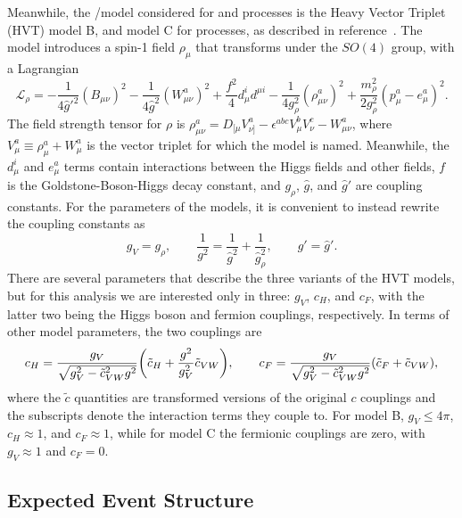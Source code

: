 Meanwhile, the \Wpr/\Zpr model considered for \ggF and \DY processes is the Heavy Vector Triplet (HVT) model B, and model C for \VBF processes, as described in reference~\cite{Pappadopulo_2014}.
The model introduces a spin-1 field $\rho_\mu$ that transforms under the $SO(4)$ group, with a Lagrangian
\begin{equation}
  \mathcal{L}_\rho=-\frac{1}{4\hat{g}'^2}(B_{\mu\nu})^2-\frac{1}{4\hat{g}^2}(W_{\mu\nu}^a)^2+\frac{f^2}{4}d_\mu^id^{\mu i}-\frac{1}{4g_\rho^2}(\rho_{\mu\nu}^a)^2+\frac{m_\rho^2}{2g_\rho^2}(p_\mu^a-e_\mu^a)^2.
\end{equation}
The field strength tensor for $\rho$ is $\rho_{\mu\nu}^a=D_{[\mu}V_{\nu]}^a-\epsilon^{abc}V_\mu^bV_\nu^c-W_{\mu\nu}^a$, where $V_\mu^a\equiv\rho_\mu^a+W_\mu^a$ is the vector triplet for which the model is named.
Meanwhile, the $d_\mu^i$ and $e_\mu^a$ terms contain interactions between the Higgs fields and other fields, $f$ is the Goldstone-Boson-Higgs decay constant, and $g_\rho$, $\hat{g}$, and $\hat{g}'$ are coupling constants.
For the parameters of the models, it is convenient to instead rewrite the coupling constants as
\begin{equation}
  g_V=g_\rho,\qquad \frac{1}{g^2}=\frac{1}{\hat{g}^2}+\frac{1}{\hat{g}_\rho^2},\qquad g'=\hat{g}'.
\end{equation}
There are several parameters that describe the three variants of the HVT models, but for this analysis we are interested only in three: $g_V$, $c_H$, and $c_F$, with the latter two being the Higgs boson and fermion couplings, respectively.
In terms of other model parameters, the two couplings are
\begin{equation}
  c_H=\frac{g_V}{\sqrt{g_V^2-\tilde{c}_{VW}^2g^2}}\pqty{\tilde{c}_H+\frac{g^2}{g_V^2}\tilde{c}_{VW}},\qquad c_F=\frac{g_V}{\sqrt{g_V^2-\tilde{c}_{VW}^2g^2}}(\tilde{c}_F+\tilde{c}_{VW}),
\end{equation}
where the $\tilde{c}$ quantities are transformed versions of the original $c$ couplings and the subscripts denote the interaction terms they couple to.
For model B, $g_V\leq4\pi$, $c_H\approx1$, and $c_F\approx1$, while for model C the fermionic couplings are zero, with $g_V\approx1$ and $c_F=0$.

\subsection{Expected Event Structure}
\label{subsec:expEvent}

